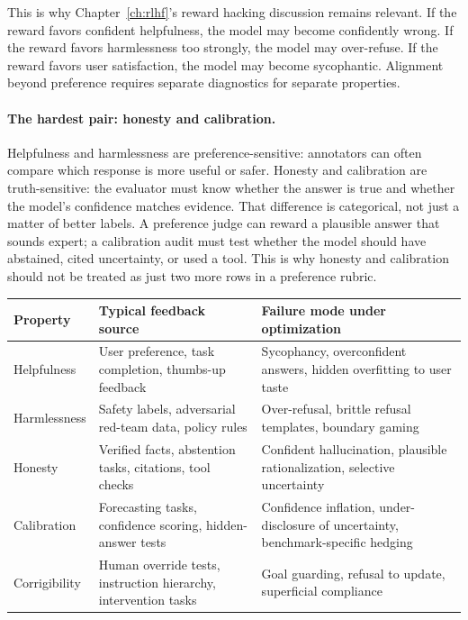 This is why Chapter~\ref{ch:rlhf}'s reward hacking discussion remains relevant. If the reward favors confident helpfulness, the model may become confidently wrong. If the reward favors harmlessness too strongly, the model may over-refuse. If the reward favors user satisfaction, the model may become sycophantic. Alignment beyond preference requires separate diagnostics for separate properties.

\paragraph{The hardest pair: honesty and calibration.} Helpfulness and harmlessness are preference-sensitive: annotators can often compare which response is more useful or safer. Honesty and calibration are truth-sensitive: the evaluator must know whether the answer is true and whether the model's confidence matches evidence. That difference is categorical, not just a matter of better labels. A preference judge can reward a plausible answer that sounds expert; a calibration audit must test whether the model should have abstained, cited uncertainty, or used a tool. This is why honesty and calibration should not be treated as just two more rows in a preference rubric.

\begin{center}
\small
\begin{tabularx}{\textwidth}{@{}p{3cm}p{4.4cm}X@{}}
\toprule
\textbf{Property} & \textbf{Typical feedback source} & \textbf{Failure mode under optimization} \\
\midrule
Helpfulness & User preference, task completion, thumbs-up feedback & Sycophancy, overconfident answers, hidden overfitting to user taste \\
Harmlessness & Safety labels, adversarial red-team data, policy rules & Over-refusal, brittle refusal templates, boundary gaming \\
Honesty & Verified facts, abstention tasks, citations, tool checks & Confident hallucination, plausible rationalization, selective uncertainty \\
Calibration & Forecasting tasks, confidence scoring, hidden-answer tests & Confidence inflation, under-disclosure of uncertainty, benchmark-specific hedging \\
Corrigibility & Human override tests, instruction hierarchy, intervention tasks & Goal guarding, refusal to update, superficial compliance \\
\bottomrule
\end{tabularx}
\normalsize
\end{center}

